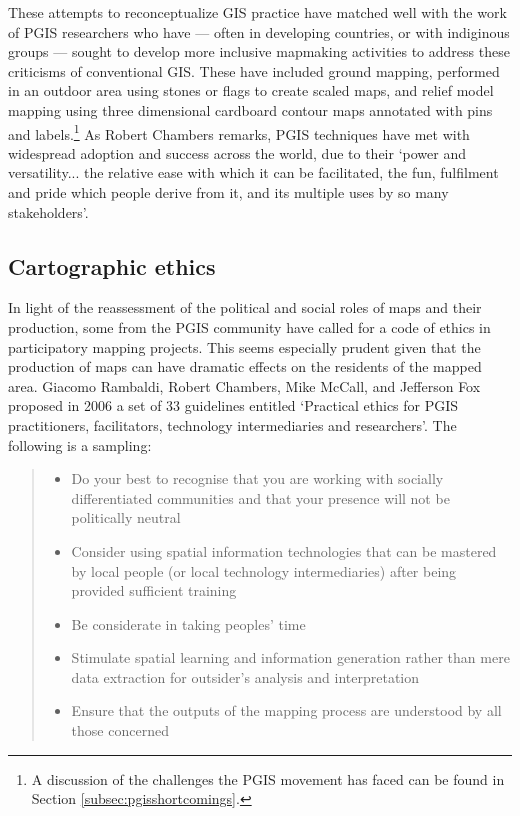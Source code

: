 \documentclass[11pt,oneside,notitlepage]{report}
\begin{document}
These attempts to reconceptualize GIS practice have matched well with the work of \ac{PGIS} researchers who have --- often in developing countries, or with indiginous groups --- sought to develop more inclusive mapmaking activities to address these criticisms of conventional GIS. These have included ground mapping, performed in an outdoor area using stones or flags to create scaled maps, and relief model mapping using three dimensional cardboard contour maps annotated with pins and labels.\footnote{A discussion of the challenges the \ac{PGIS} movement has faced can be found in Section \ref{subsec:pgisshortcomings}.} As Robert Chambers remarks, \ac{PGIS} techniques have met with widespread adoption and success across the world, due to their `power and versatility... the relative ease with which it can be facilitated, the fun, fulfilment and pride which people derive from it, and its multiple uses by so many stakeholders'. \cite{chambers2006whose}

\subsection{Cartographic ethics}
\label{sec:ethics}

In light of the reassessment of the political and social roles of maps and their production, some from the \ac{PGIS} community have called for a code of ethics in participatory mapping projects. This seems especially prudent given that the production of maps can have dramatic effects on the residents of the mapped area. Giacomo Rambaldi, Robert Chambers, Mike McCall, and Jefferson Fox proposed in 2006 a set of 33 guidelines entitled `Practical ethics for \ac{PGIS} practitioners, facilitators, technology intermediaries and researchers'. The following is a sampling:

\begin{quote}\begin{itemize}
\item Do your best to recognise that you are working with socially differentiated communities and that your presence will not be politically neutral
\item Consider using spatial information technologies that can be mastered by local people (or local technology intermediaries) after being provided sufficient training
\item Be considerate in taking peoples' time
\item Stimulate spatial learning and information generation rather than mere data extraction for outsider’s analysis and interpretation
\item Ensure that the outputs of the mapping process are understood by all those concerned
\end{itemize}
\cite{rambaldi2006practical}
\end{quote}
\end{document}
